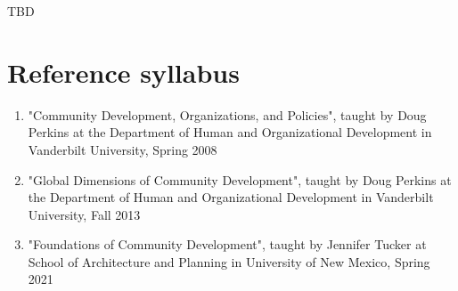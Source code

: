 \documentclass{article}
\begin{document}
TBD

\section{Reference syllabus}
    \begin{enumerate}
        \item "Community Development, Organizations, and Policies", taught by Doug Perkins at the Department of Human and Organizational Development in Vanderbilt University, Spring 2008
        \item "Global Dimensions of Community Development", taught by Doug Perkins at the Department of Human and Organizational Development in Vanderbilt University, Fall 2013
        \item "Foundations of Community Development", taught by Jennifer Tucker at School of Architecture and Planning in University of New Mexico, Spring 2021
    \end{enumerate}
\end{document}
